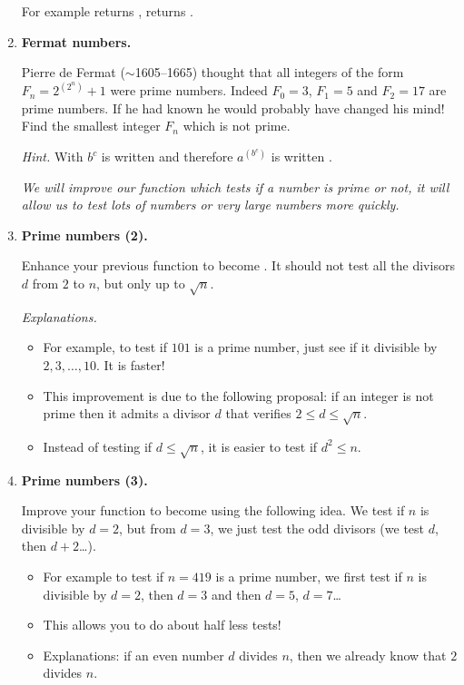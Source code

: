 \documentclass[11pt,class=report,crop=false]{standalone}
\begin{document}
\begin{activite}
\begin{enumerate}
  For example  returns ,  returns .
  
  \item \textbf{Fermat numbers.}
  
  Pierre de Fermat ($\sim$1605--1665) thought that all integers of the form $F_n = 2^{(2^n)}+1$ were prime numbers. Indeed $F_0=3$, $F_1=5$ and $F_2=17$
  are prime numbers. If he had known \Python{} he would probably have changed his mind! Find the smallest integer $F_n$ which is not prime.
  
  \emph{Hint.} With \Python{} $b^c$ is written  and therefore
  $a^{(b^c)}$ is written .
  
  \bigskip
  
  \emph{We will improve our function which tests if a number is prime or not, it will allow us to test lots of numbers or very large numbers more quickly.}  
  
  \item \textbf{Prime numbers (2).}
  
   Enhance your previous function to become . It should not test all the divisors $d$ from $2$ to $n$, but only up to $\sqrt{n}$.
   
  \emph{Explanations.}
  \begin{itemize}
    \item For example, to test if $101$ is a prime number, just see if it divisible by $2,3,\ldots,10$. It is faster!
    
    \item This improvement is due to the following proposal: if an integer is not prime then it admits a divisor $d$ that verifies $2 \le d \le \sqrt{n}$.
    
    \item Instead of testing if $d \le \sqrt{n}$, it is easier to test if $d^2 \le n$.
   \end{itemize} 
  
  
  \item \textbf{Prime numbers (3).}  
  
  Improve your function to become  using the following idea.  We test if $n$ is divisible by $d=2$, but from $d=3$, we just test the odd divisors (we test $d$, then $d+2$\ldots).
 
 \begin{itemize}
   \item For example to test if $n = 419$ is a prime number, we first test if $n$ is divisible by $d=2$, then $d=3$ and then $d=5$, $d=7$\ldots 
   \item This allows you to do about half less tests!
   \item Explanations: if an even number $d$ divides $n$, then we already know that $2$ divides $n$.   
   \end{itemize}
  

\end{enumerate}
\end{activite}
\end{document}
